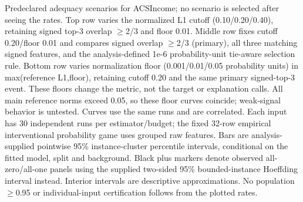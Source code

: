 Predeclared adequacy scenarios for ACSIncome; no scenario is selected after seeing the rates. Top row varies the normalized L1 cutoff (0.10/0.20/0.40), retaining signed top-3 overlap $\geq$2/3 and floor 0.01. Middle row fixes cutoff 0.20/floor 0.01 and compares signed overlap $\geq$2/3 (primary), all three matching signed features, and the analysis-defined 1e-6 probability-unit tie-aware selection rule. Bottom row varies normalization floor (0.001/0.01/0.05 probability units) in max(reference L1,floor), retaining cutoff 0.20 and the same primary signed-top-3 event. These floors change the metric, not the target or explanation calls. All main reference norms exceed 0.05, so these floor curves coincide; weak-signal behavior is untested. Curves use the same runs and are correlated. Each input has 30 independent runs per estimator/budget; the fixed 32-row empirical interventional probability game uses grouped raw features. Bars are analysis-supplied pointwise 95\% instance-cluster percentile intervals, conditional on the fitted model, split and background. Black plus markers denote observed all-zero/all-one panels using the supplied two-sided 95\% bounded-instance Hoeffding interval instead. Interior intervals are descriptive approximations. No population $\geq$0.95 or individual-input certification follows from the plotted rates.
